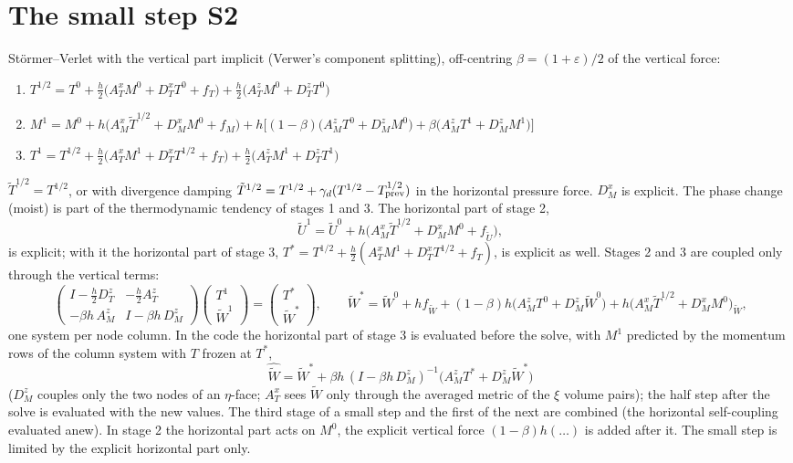 \documentclass[11pt,a4paper]{article}
\begin{document}
\section{The small step S2}\label{sec:s2}
Störmer--Verlet with the vertical part implicit (Verwer's component splitting), off-centring $\beta=(1+\varepsilon)/2$ of the vertical force:
\begin{enumerate}
\item $T^{1/2}=T^0+\tfrac h2\big(A_T^xM^0+D_T^xT^0+f_T\big)+\tfrac h2\big(A_T^zM^0+D_T^zT^0\big)$
\item $M^1=M^0+h\big(A_M^x\tilde T^{1/2}+D_M^xM^0+f_M\big)+h\big[(1-\beta)\big(A_M^zT^0+D_M^zM^0\big)+\beta\big(A_M^zT^1+D_M^zM^1\big)\big]$
\item $T^1=T^{1/2}+\tfrac h2\big(A_T^xM^1+D_T^xT^{1/2}+f_T\big)+\tfrac h2\big(A_T^zM^1+D_T^zT^1\big)$
\end{enumerate}
$\tilde T^{1/2}=T^{1/2}$, or with divergence damping $\tilde T^{1/2}=T^{1/2}+\gamma_d(T^{1/2}-T^{1/2}_{\rm prev})$ in the horizontal pressure force.
$D_M^x$ is explicit. The phase change (moist) is part of the thermodynamic tendency of stages 1 and 3. The horizontal part of stage 2,
\[
\tilde U^1=\tilde U^0+h\big(A_M^x\tilde T^{1/2}+D_M^xM^0+f_{\tilde U}\big),
\]
is explicit; with it the horizontal part of stage 3, $T^*=T^{1/2}+\tfrac h2(A_T^xM^1+D_T^xT^{1/2}+f_T)$, is explicit as well. Stages 2 and 3 are
coupled only through the vertical terms:
\[
\begin{pmatrix}I-\tfrac h2D_T^z&-\tfrac h2A_T^z\\-\beta h\,A_M^z&I-\beta h\,D_M^z\end{pmatrix}\begin{pmatrix}T^1\\\tilde W^1\end{pmatrix}=\begin{pmatrix}T^*\\\tilde W^*\end{pmatrix},\qquad
\tilde W^*=\tilde W^0+hf_{\tilde W}+(1-\beta)h\big(A_M^zT^0+D_M^z\tilde W^0\big)+h\big(A_M^x\tilde T^{1/2}+D_M^xM^0\big)_{\tilde W},
\]
one system per node column. In the code the horizontal part of stage 3 is evaluated before the solve, with $M^1$ predicted by the
momentum rows of the column system with $T$ frozen at $T^*$,
\[
\hat{\tilde W}=\tilde W^*+\beta h\,(I-\beta h\,D_M^z)^{-1}\big(A_M^zT^*+D_M^z\tilde W^*\big)
\]
($D_M^z$ couples only the two nodes of an $\eta$-face; $A_T^x$ sees $\tilde W$ only through the averaged metric of the $\xi$ volume pairs);
the half step after the solve is evaluated with the new values. The third stage of a small step and the first of the next are combined (the
horizontal self-coupling evaluated anew). In stage 2 the horizontal part acts on $M^0$, the explicit vertical force $(1-\beta)h(\dots)$ is added
after it. The small step is limited by the explicit horizontal part only.
\end{document}
